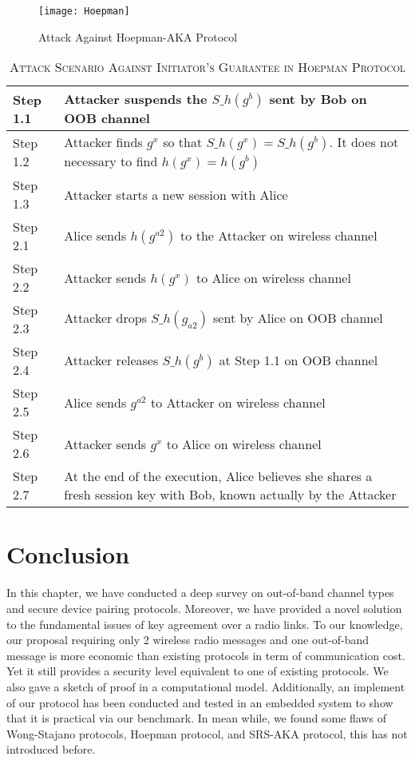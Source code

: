 \begin{figure}
  \centering
  \texttt{[image: Hoepman]}
  \caption{Attack Against Hoepman-AKA Protocol}
  \label{Hoepman}
\end{figure}

\begin{table}[t]
\centering
\caption{\textsc{Attack Scenario Against Initiator's Guarantee in Hoepman Protocol}}
\label{Hoepmantable}
{\small
\begin{tabular}{| l | p{11cm} |}
 \hline
 Step 1.1 & Attacker suspends the $S\_h(g^b)$ sent by Bob on OOB channel\\ \hline
 Step 1.2 & Attacker finds $g^x$ so that $S\_h(g^x) = S\_h(g^b)$. It does not necessary to find $h(g^x) = h(g^b)$  \\ \hline
 Step 1.3 & Attacker starts a new session with Alice\\ \hline \hline
 Step 2.1 & Alice sends $h(g^{a2})$ to the Attacker on wireless channel\\ \hline
 Step 2.2 & Attacker sends $h(g^{x})$ to Alice on wireless channel\\ \hline
 Step 2.3 & Attacker drops $S\_h(g_{a2})$ sent by Alice on OOB channel\\ \hline
 Step 2.4 & Attacker releases $S\_h(g^b)$ at Step 1.1 on OOB channel \\ \hline
 Step 2.5 & Alice sends $g^{a2}$ to Attacker on wireless channel \\ \hline
 Step 2.6 & Attacker sends $g^{x}$ to Alice on wireless channel\\ \hline
 Step 2.7 & At the end of the execution, Alice believes she shares a fresh session key with Bob, known actually by the Attacker\\ \hline
\end{tabular}
}
\end{table}

\section{Conclusion}

In this chapter, we have conducted a deep survey on out-of-band channel types and secure device pairing protocols. Moreover, we have provided a novel solution to the fundamental issues of key agreement over a radio links. To our knowledge, our proposal requiring only 2 wireless radio messages and one out-of-band message is more economic than existing protocols in term of communication cost. Yet it still provides a security level equivalent to one of existing protocols. We also gave a sketch of proof in a computational model. Additionally, an implement of our protocol has been conducted and tested in an embedded system to show that it is practical via our benchmark. In mean while, we found some flaws of Wong-Stajano protocols, Hoepman protocol, and SRS-AKA protocol, this has not introduced before. 





